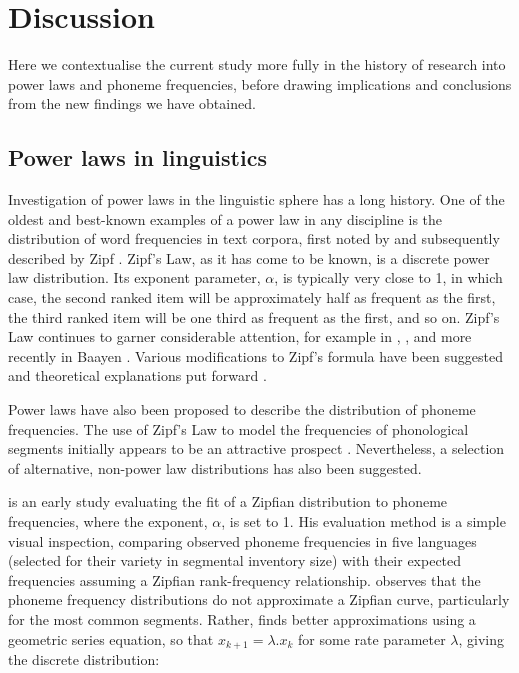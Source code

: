 \hypertarget{phon-freq-discussion}{%
\section{Discussion}\label{phon-freq-discussion}}

Here we contextualise the current study more fully in the history of research into power laws and phoneme frequencies, before drawing implications and conclusions from the new findings we have obtained.

\hypertarget{power-laws-linguistics}{%
\subsection{Power laws in linguistics}\label{power-laws-linguistics}}

Investigation of power laws in the linguistic sphere has a long history. One of the oldest and best-known examples of a power law in any discipline is the distribution of word frequencies in text corpora, first noted by \textcite{estoup_gammes_1916} and subsequently described by Zipf \autocites*{zipf_selective_1932}{zipf_human_1949}. Zipf's Law, as it has come to be known, is a discrete power law distribution. Its exponent parameter, \(\alpha\), is typically very close to 1, in which case, the second ranked item will be approximately half as frequent as the first, the third ranked item will be one third as frequent as the first, and so on. Zipf's Law continues to garner considerable attention, for example in \textcite{kucera_computational_1967}, \textcite{montemurro_beyond_2001}, and more recently in Baayen \autocites*{baayen_word_2001}{baayen_analyzing_2008}. Various modifications to Zipf's formula have been suggested \autocite[notably][]{mandelbrot_structure_1954} and theoretical explanations put forward \autocites{li_random_1992}{naranan_information_1992}{naranan_models_1998}.

Power laws have also been proposed to describe the distribution of phoneme frequencies. The use of Zipf's Law to model the frequencies of phonological segments initially appears to be an attractive prospect \autocite[pp.~565--566]{witten_source_1990}. Nevertheless, a selection of alternative, non-power law distributions has also been suggested.

\textcite{sigurd_rank-frequency_1968} is an early study evaluating the fit of a Zipfian distribution to phoneme frequencies, where the exponent, \(\alpha\), is set to 1. His evaluation method is a simple visual inspection, comparing observed phoneme frequencies in five languages (selected for their variety in segmental inventory size) with their expected frequencies assuming a Zipfian rank-frequency relationship. \textcite[p.~8]{sigurd_rank-frequency_1968} observes that the phoneme frequency distributions do not approximate a Zipfian curve, particularly for the most common segments. Rather, \textcite{sigurd_rank-frequency_1968} finds better approximations using a geometric series equation, so that \(x_{k+1} = \lambda.x_k\) for some rate parameter \(\lambda\), giving the discrete distribution:

